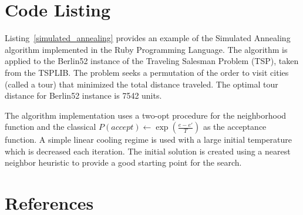 \documentclass[a4paper, 11pt]{article}
\begin{document}
\section{Code Listing}
\label{sec:code}
Listing~\ref{simulated_annealing} provides an example of the Simulated Annealing algorithm implemented in the Ruby Programming Language. 
The algorithm is applied to the Berlin52 instance of the Traveling Salesman Problem (TSP), taken from the TSPLIB. The problem seeks a permutation of the order to visit cities (called a tour) that minimized the total distance traveled. The optimal tour distance for Berlin52 instance is 7542 units.

The algorithm implementation uses a two-opt procedure for the neighborhood function and the classical $P(accept) \leftarrow \exp(\frac{e-e\prime}{T})$ as the acceptance function. A simple linear cooling regime is used with a large initial temperature which is decreased each iteration. The initial solution is created using a nearest neighbor heuristic to provide a good starting point for the search.




\section{References}
\label{sec:references}
\end{document}
